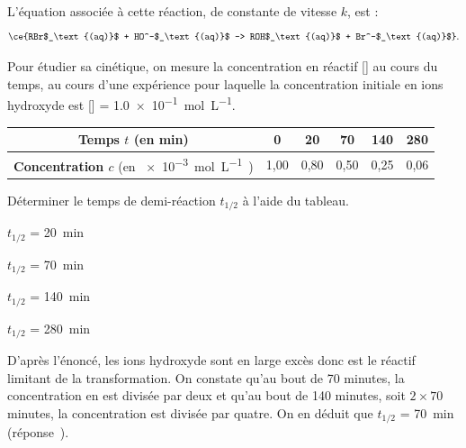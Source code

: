L’équation associée à cette réaction, de constante de vitesse $k$, est :
\[
\ce{RBr$_\text{(aq)}$ + HO^-$_\text{(aq)}$ -> ROH$_\text{(aq)}$ + Br^-$_\text{(aq)}$}.
\]

Pour étudier sa cinétique, on mesure la concentration en réactif [] au cours du temps, au cours d'une expérience pour laquelle la concentration initiale en ions hydroxyde est [] = \SI{1,0e-1}{\mol\per\liter}. 
 
 
\begin{center}
\renewcommand{\arraystretch}{1.2}
\begin{tabular}{|c|c|c|c|c|c|}
\hline
\textbf{Temps} $t$ (en min)& 0 & 20 & 70 & 140 & 280\\
\hline
\textbf{Concentration $c$} (en \SI{e-3}{\mol\per\liter)}&1,00 & 0,80 & 0,50&0,25&0,06\\
\hline
\end{tabular}
\renewcommand{\arraystretch}{1}
\end{center}

\debutEntrainement


\begin{enonce}
Déterminer le temps de demi-réaction $t_{1/2}$ à l'aide du tableau.

	\begin{listeQCM2Colonnes}
	\item $t_{1/2}$ = \SI{20}{\minute}
	\item $t_{1/2}$ = \SI{70}{\minute}
	\item $t_{1/2}$ = \SI{140}{\minute}
	\item $t_{1/2}$ = \SI{280}{\minute}
	\end{listeQCM2Colonnes}
	
\end{enonce}

\reponse{\reponseB{}}

\begin{corrige}
D'après l'énoncé, les ions hydroxyde sont en large excès donc  est le réactif limitant de la transformation. On constate qu'au bout de 70 minutes, la concentration en  est divisée par deux et qu'au bout de 140 minutes, soit $2 \times 70$ minutes, la concentration est divisée par quatre. On en déduit que $t_{1/2}$ = \SI{70}{\minute} (réponse~\reponseB{}).
\end{corrige}

